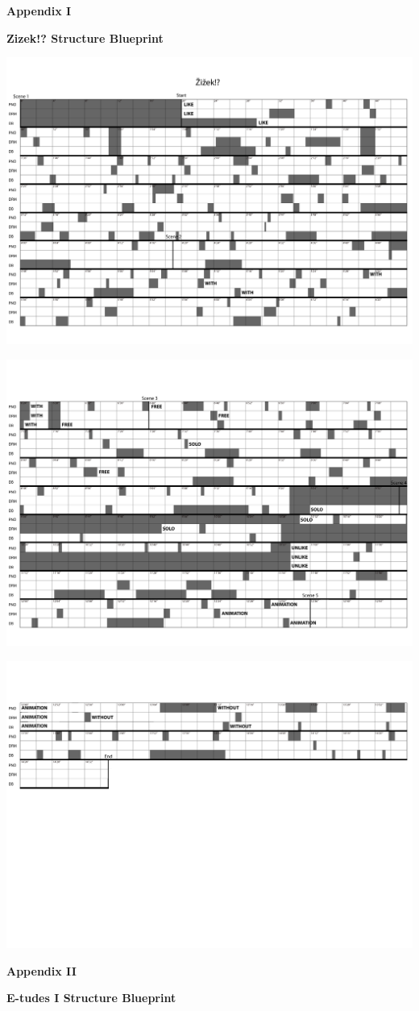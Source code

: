 \huge 

\centering
\textbf{Appendix I}  

\vspace{20pt} 
\large
\textbf{Zizek!? Structure Blueprint}

\includegraphics[width=15cm]{Appendixes/zizek_page1.png}

\includegraphics[width=15cm]{Appendixes/zizek_page2.png}

\includegraphics[width=15cm]{Appendixes/zizek_page3.png}

\huge 
\textbf{Appendix II} 

\vspace{20pt} 
\large
\textbf{E-tudes I Structure Blueprint}